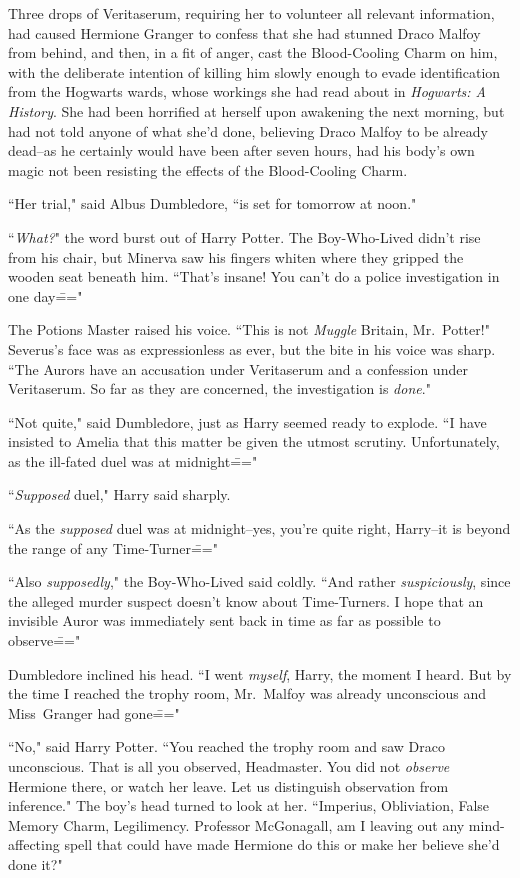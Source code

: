 Three drops of Veritaserum, requiring her to volunteer all relevant information, had caused Hermione Granger to confess that she had stunned Draco Malfoy from behind, and then, in a fit of anger, cast the Blood-Cooling Charm on him, with the deliberate intention of killing him slowly enough to evade identification from the Hogwarts wards, whose workings she had read about in \emph{Hogwarts: A History}. She had been horrified at herself upon awakening the next morning, but had not told anyone of what she'd done, believing Draco Malfoy to be already dead\---as he certainly would have been after seven hours, had his body's own magic not been resisting the effects of the Blood-Cooling Charm.

``Her trial," said Albus Dumbledore, ``is set for tomorrow at noon."

``\emph{What?}" the word burst out of Harry Potter. The Boy-Who-Lived didn't rise from his chair, but Minerva saw his fingers whiten where they gripped the wooden seat beneath him. ``That's insane! You can't do a police investigation in one day\==="

The Potions Master raised his voice. ``This is not \emph{Muggle} Britain, Mr.~Potter!" Severus's face was as expressionless as ever, but the bite in his voice was sharp. ``The Aurors have an accusation under Veritaserum and a confession under Veritaserum. So far as they are concerned, the investigation is \emph{done}."

``Not quite," said Dumbledore, just as Harry seemed ready to explode. ``I have insisted to Amelia that this matter be given the utmost scrutiny. Unfortunately, as the ill-fated duel was at midnight\==="

``\emph{Supposed} duel," Harry said sharply.

``As the \emph{supposed} duel was at midnight\---yes, you're quite right, Harry\---it is beyond the range of any Time-Turner\==="

``Also \emph{supposedly}," the Boy-Who-Lived said coldly. ``And rather \emph{suspiciously}, since the alleged murder suspect doesn't know about Time-Turners. I hope that an invisible Auror was immediately sent back in time as far as possible to observe\==="

Dumbledore inclined his head. ``I went \emph{myself}, Harry, the moment I heard. But by the time I reached the trophy room, Mr.~Malfoy was already unconscious and Miss~Granger had gone\==="

``No," said Harry Potter. ``You reached the trophy room and saw Draco unconscious. That is all you observed, Headmaster. You did not \emph{observe} Hermione there, or watch her leave. Let us distinguish observation from inference." The boy's head turned to look at her. ``Imperius, Obliviation, False Memory Charm, Legilimency. Professor McGonagall, am I leaving out any mind-affecting spell that could have made Hermione do this or make her believe she'd done it?"


